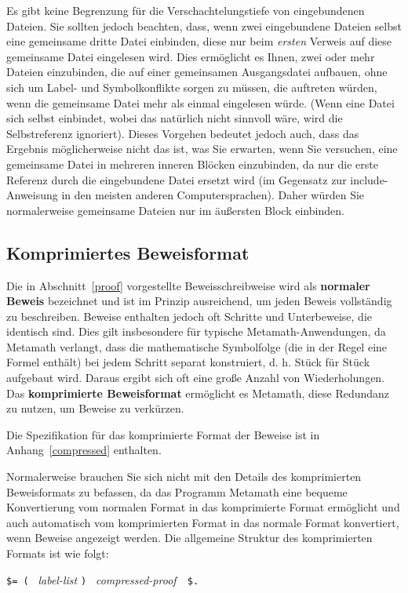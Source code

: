 Es gibt keine Begrenzung für die Verschachtelungstiefe von eingebundenen Dateien.  Sie sollten jedoch beachten, dass, wenn zwei eingebundene Dateien selbst eine gemeinsame dritte Datei einbinden, diese nur beim {\em ersten} Verweis auf diese gemeinsame Datei eingelesen wird.  Dies ermöglicht es Ihnen, zwei oder mehr Dateien einzubinden, die auf einer gemeinsamen Ausgangsdatei aufbauen, ohne sich um Label- und Symbolkonflikte sorgen zu müssen, die auftreten würden, wenn die gemeinsame Datei mehr als einmal eingelesen würde.  (Wenn eine Datei sich selbst einbindet, wobei das natürlich nicht sinnvoll wäre, wird die Selbstreferenz ignoriert).  Dieses Vorgehen bedeutet jedoch auch, dass das Ergebnis möglicherweise nicht das ist, was Sie erwarten, wenn Sie versuchen, eine gemeinsame Datei in mehreren inneren Blöcken einzubinden, da nur die erste Referenz durch die eingebundene Datei ersetzt wird (im Gegensatz zur include-Anweisung in den meisten anderen Computersprachen).  Daher würden Sie normalerweise gemeinsame Dateien nur im äußersten Block einbinden.

\subsection{Komprimiertes Beweisformat}\label{compressed1}

Die in Abschnitt~\ref{proof} vorgestellte Beweisschreibweise wird als {\bf normaler Beweis} bezeichnet und ist im Prinzip ausreichend, um jeden Beweis vollständig zu beschreiben.  Beweise enthalten jedoch oft Schritte und Unterbeweise, die identisch sind.  Dies gilt insbesondere für typische Metamath-Anwendungen, da Metamath verlangt, dass die mathematische Symbolfolge (die in der Regel eine Formel enthält) bei jedem Schritt separat konstruiert, d. h. Stück für Stück aufgebaut wird. Daraus ergibt sich oft eine große Anzahl von Wiederholungen.  Das {\bf komprimierte Beweisformat} ermöglicht es Metamath, diese Redundanz zu nutzen, um Beweise zu verkürzen.

Die Spezifikation für das komprimierte Format der Beweise ist in Anhang~\ref{compressed} enthalten.

Normalerweise brauchen Sie sich nicht mit den Details des komprimierten Beweisformats zu befassen, da das Programm Metamath eine bequeme Konvertierung vom normalen Format in das komprimierte Format ermöglicht und auch automatisch vom komprimierten Format in das normale Format konvertiert, wenn Beweise angezeigt werden. Die allgemeine Struktur des komprimierten Formats ist wie folgt:
\begin{center}
  \texttt{\$= ( } {\em label-list} \texttt{) } {\em compressed-proof\ }\ \texttt{\$.}
\end{center}

